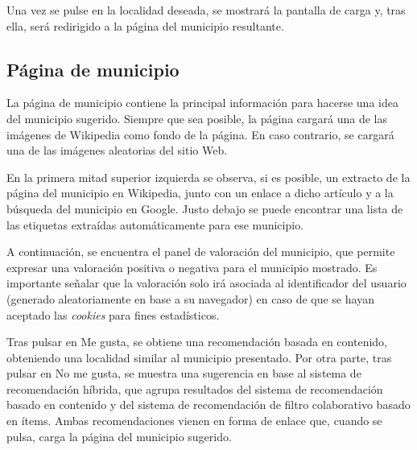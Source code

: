 Una vez se pulse en la localidad deseada, se mostrará la pantalla de carga y, tras ella, será redirigido a la página del municipio resultante.


\subsection{Página de municipio}

La página de municipio contiene la principal información para hacerse una idea del municipio sugerido. Siempre que sea posible, la página cargará una de las imágenes de Wikipedia como fondo de la página. En caso contrario, se cargará una de las imágenes aleatorias del sitio Web.


En la primera mitad superior izquierda se observa, si es posible, un extracto de la página del municipio en Wikipedia, junto con un enlace a dicho artículo y a la búsqueda del municipio en Google. Justo debajo se puede encontrar una lista de las etiquetas extraídas automáticamente para ese municipio.

A continuación, se encuentra el panel de valoración del municipio, que permite expresar una valoración positiva o negativa para el municipio mostrado. Es importante señalar que la valoración solo irá asociada al identificador del usuario (generado aleatoriamente en base a su navegador) en caso de que se hayan aceptado las \textit{cookies} para fines estadísticos.

Tras pulsar en \guillemotleft Me gusta\guillemotright, se obtiene una recomendación basada en contenido, obteniendo una localidad similar al municipio presentado. Por otra parte, tras pulsar en \guillemotleft No me gusta\guillemotright, se muestra una sugerencia en base al sistema de recomendación híbrida, que agrupa resultados del sistema de recomendación basado en contenido y del sistema de recomendación de filtro colaborativo basado en ítems. Ambas recomendaciones vienen en forma de enlace que, cuando se pulsa, carga la página del municipio sugerido.



